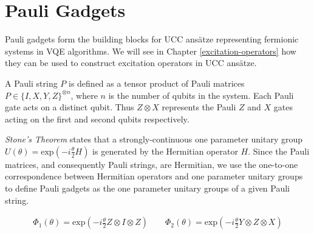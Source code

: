 \chapter{Pauli Gadgets}%
\label{pauli-gadgets}

Pauli gadgets form the building blocks for UCC ansätze representing fermionic systems in VQE algorithms. We will see in Chapter \ref{excitation-operators} how they can be used to construct excitation operators in UCC ansätze.

A Pauli string $P$ is defined as a tensor product of Pauli matrices $P \in \{I, X, Y, Z\}^{\otimes n}$, where $n$ is the number of qubits in the system. Each Pauli gate acts on a distinct qubit. Thus $Z \otimes X$ represents the Pauli $Z$ and $X$ gates acting on the first and second qubits respectively.

\textit{Stone's Theorem} \cite{Stone1932} states that a strongly-continuous one parameter unitary group $U(\theta) = \text{exp} \left(- i \frac{\theta}{2} H \right)$ is generated by the Hermitian operator $H$. Since the Pauli matrices, and consequently Pauli strings, are Hermitian, we use the one-to-one correspondence between Hermitian operators and one parameter unitary groups to define Pauli gadgets as the one parameter unitary groups of a given Pauli string.

\begin{gather*}
    \Phi_1(\theta) = \text{exp}\left(- i \frac{\theta}{2} Z \otimes I \otimes Z \right) \qquad
    \Phi_2(\theta) = \text{exp}\left(- i \frac{\theta}{2} Y \otimes Z \otimes X \right)%
\end{gather*}
